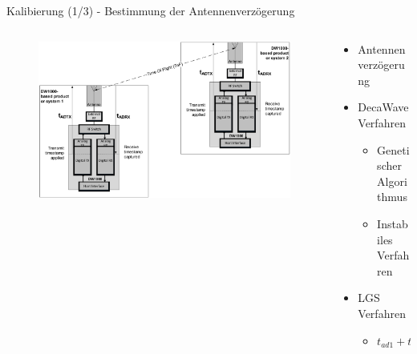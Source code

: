\documentclass{beamer}
\begin{document}
%
%
\begin{frame}{Kalibierung (1/3) - Bestimmung der Antennenverzögerung}
	\begin{columns}
		\begin{column}{0.5\linewidth}
			\begin{figure}
				\includegraphics[width=\linewidth]{decawave2014calibration_fig1}
				\caption{\cite{decawave2014calibration}}
			\end{figure}
		\end{column}
		\begin{column}{0.5\linewidth}
			\begin{itemize}
				\item Antennenverzögerung
				\item DecaWave Verfahren
					\begin{itemize}
						\item Genetischer Algorithmus
						\item Instabiles Verfahren
					\end{itemize}
				\item LGS Verfahren
					\begin{itemize}
						\item $t_{ad1} + t_{ad2} = tof_{measured} - tof_{actual}$
					\end{itemize}
			\end{itemize}
		\end{column}
	\end{columns}
\end{frame}
\end{document}
